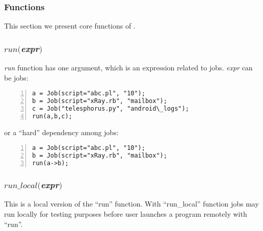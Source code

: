 
\subsubsection*{\lang{} Functions}

This section we present core functions of \lang{}.
\subsubsection*{$run($\textit{expr}$)$}
\textit{run} function has one argument, which is an expression related to jobs.
\textit{expr} can be jobs:
\begin{Verbatim}[numbers=left]
a = Job(script="abc.pl", "10");
b = Job(script="xRay.rb", "mailbox");
c = Job("telesphorus.py", "android\_logs");
run(a,b,c);
\end{Verbatim}

or a ``hard'' dependency among jobs:
\begin{Verbatim}[numbers=left]
a = Job(script="abc.pl", "10");
b = Job(script="xRay.rb", "mailbox");
run(a->b);
\end{Verbatim}
\subsubsection*{$run\_local($\textit{expr}$)$}
This is a local version of the ``run'' function.
With ``run\_local'' function jobs may run locally for testing purposes before
user launches a program remotely with ``run''.
